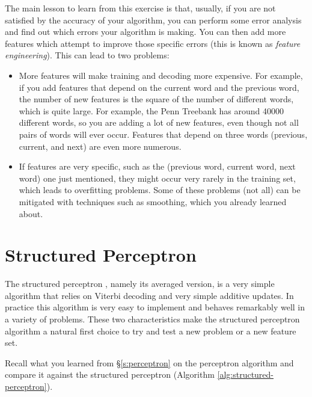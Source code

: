 The main lesson to learn from this exercise is that, usually, if you are not satisfied by the accuracy of your algorithm, you can perform some error analysis and find out which errors your algorithm is making. You can then add more features which attempt to improve those specific errors (this is known as \emph{feature engineering}). This can lead to two problems:
\begin{itemize}
\item More features will make training and decoding more expensive. For example, if you add features that depend on the current word and the previous word, the number of new features is the square of the number of different words, which is quite large. For example, the Penn Treebank has around 40000 different words, so you are adding a lot of new features, even though not all pairs of words will ever occur. Features that depend on three words (previous, current, and next) are even more numerous.
\item If features are very specific, such as the (previous word, current word, next word) one just mentioned, they might occur very rarely in the training set, which leads to overfitting problems. Some of these problems (not all) can be mitigated with techniques such as smoothing, which you already learned about.
\end{itemize}







\section{\label{s:spercetron}Structured Perceptron}

The structured perceptron \citep{collins2002discriminative}, namely its averaged version, is a very simple
algorithm that relies on Viterbi decoding and very simple additive
updates. In practice this algorithm is very easy to implement and
behaves remarkably well in a variety of problems. These two
characteristics make the structured perceptron algorithm a natural
first choice to try and test a new problem or a new feature set. 

Recall what you learned from \S\ref{s:perceptron} on the
perceptron algorithm and compare it against the structured perceptron
(Algorithm \ref{alg:structured-perceptron}). 

